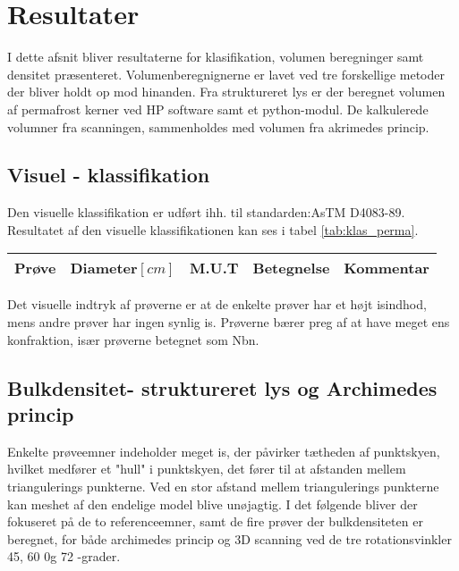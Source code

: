 \chapter{Resultater}
I dette afsnit bliver resultaterne for klasifikation, volumen beregninger samt densitet præsenteret. Volumenberegnignerne er lavet ved tre forskellige metoder der bliver holdt op mod hinanden. Fra struktureret lys er der beregnet volumen af permafrost kerner ved HP software samt et python-modul. De kalkulerede volumner fra scanningen, sammenholdes med volumen fra akrimedes princip.

\section{Visuel - klassifikation}
Den visuelle klassifikation er udført ihh. til standarden:AsTM D4083-89. Resultatet af den visuelle klassifikationen kan ses i tabel \vref{tab:klas_perma}. 
%
\begin{table}
  \centering
  \label{tab:klas_perma}
  \begin{tabular}{l c l l l}
  \toprule
 \multicolumn{1}{l}{Prøve} & 	\multicolumn{1}{c}{Diameter$[cm]$} & \multicolumn{1}{l}{M.U.T} &	\multicolumn{1}{l}{Betegnelse} & \multicolumn{1}{l}{Kommentar} \\
\midrule

\bottomrule
  \end{tabular}
  \end{table}
%
Det visuelle indtryk af prøverne er at de enkelte prøver har et højt isindhod, mens andre prøver har ingen synlig is. Prøverne bærer preg af at have meget ens konfraktion, især prøverne betegnet som Nbn.  
\FloatBlock
\section{Bulkdensitet- struktureret lys og Archimedes princip}
Enkelte prøveemner indeholder meget is, der påvirker tætheden af punktskyen, hvilket medfører et "hull" i punktskyen, det fører til at afstanden mellem triangulerings punkterne. Ved en stor afstand mellem triangulerings punkterne kan meshet af den endelige model blive unøjagtig. 
I det følgende bliver der fokuseret på de to referenceemner, samt de fire prøver der bulkdensiteten er beregnet, for både archimedes princip og 3D scanning ved de tre rotationsvinkler 45, 60 0g 72 -grader. 

